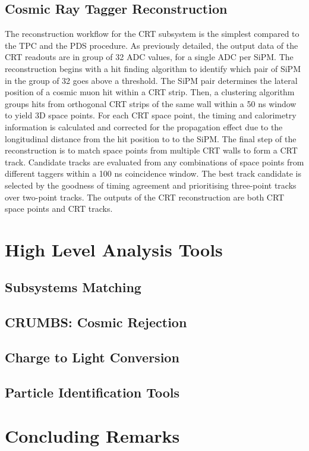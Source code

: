 \subsection{Cosmic Ray Tagger Reconstruction}

The reconstruction workflow for the CRT subsystem is the simplest compared to the TPC and the PDS procedure.
As previously detailed, the output data of the CRT readouts are in group of 32 ADC values, for a single ADC per SiPM.
The reconstruction begins with a hit finding algorithm to identify which pair of SiPM in the group of 32 goes above a threshold.
The SiPM pair determines the lateral position of a cosmic muon hit within a CRT strip.
Then, a clustering algorithm groups hits from orthogonal CRT strips of the same wall within a 50 ns window to yield 3D space points.
For each CRT space point, the timing and calorimetry information is calculated and corrected for the propagation effect due to the longitudinal distance from the hit position to to the SiPM.
The final step of the reconstruction is to match space points from multiple CRT walls to form a CRT track.
Candidate tracks are evaluated from any combinations of space points from different taggers within a 100 ns coincidence window.
The best track candidate is selected by the goodness of timing agreement and prioritising three-point tracks over two-point tracks. 
The outputs of the CRT reconstruction are both CRT space points and CRT tracks. 

\section{High Level Analysis Tools}

\subsection{Subsystems Matching}

\subsection{CRUMBS: Cosmic Rejection}

\subsection{Charge to Light Conversion}

\subsection{Particle Identification Tools}

\section{Concluding Remarks}
